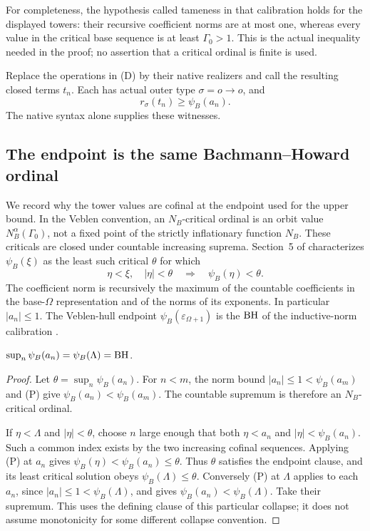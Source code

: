 For completeness, the hypothesis called tameness in that calibration
holds for the displayed towers: their recursive coefficient norms are
at most one, whereas every value in the critical base sequence is at
least $\Gamma_0>1$. This is the actual inequality needed in the proof;
no assertion that a critical ordinal is finite is used.

Replace the operations in (D) by their native realizers and call the
resulting closed terms $t_n$. Each has actual outer type $\sigma=o\to o$,
and
\[
 r_\sigma(t_n)\ge\psi_B(a_n).
 \tag{R}
\]
The native syntax alone supplies these witnesses.

\subsection{The endpoint is the same Bachmann--Howard ordinal}
We record why the tower values are cofinal at the endpoint used for the
upper bound. In the Veblen convention, an $N_B$-critical ordinal is an
orbit value $N_B^\alpha(\Gamma_0)$, not a fixed point of the strictly
inflationary function $N_B$. These criticals are closed under countable
increasing suprema. Section~5 of \cite{simmons2004} characterizes
$\psi_B(\xi)$ as the least such critical $\theta$ for which
\[
 \eta<\xi,\quad |\eta|<\theta
       \quad\Longrightarrow\quad \psi_B(\eta)<\theta .
 \tag{P}
\]
The coefficient norm is recursively the maximum of the countable
coefficients in the base-$\Omega$ representation and of the norms
of its exponents. In particular $|a_n|\le1$.
The Veblen-hull endpoint $\psi_B(\varepsilon_{\Omega+1})$ is the
$\mathrm{BH}$ of the inductive-norm calibration
\cite[Sections~9.4--9.5]{pohlers}.

\begin{lemma}\label{lem:tower-cofinality}
$\sup_n\psi_B(a_n)=\psi_B(\Lambda)=\mathrm{BH}$.
\end{lemma}
\begin{proof}
Let $\theta=\sup_n\psi_B(a_n)$. For $n<m$, the norm bound
$|a_n|\le1<\psi_B(a_m)$ and (P) give
$\psi_B(a_n)<\psi_B(a_m)$. The countable supremum is therefore
an $N_B$-critical ordinal.

If $\eta<\Lambda$ and $|\eta|<\theta$, choose $n$ large enough
that both $\eta<a_n$ and $|\eta|<\psi_B(a_n)$. Such a common
index exists by the two increasing cofinal sequences. Applying
(P) at $a_n$ gives $\psi_B(\eta)<\psi_B(a_n)\le\theta$.
Thus $\theta$ satisfies the endpoint clause, and its least
critical solution obeys $\psi_B(\Lambda)\le\theta$.
Conversely (P) at $\Lambda$ applies to each $a_n$, since
$|a_n|\le1<\psi_B(\Lambda)$, and gives
$\psi_B(a_n)<\psi_B(\Lambda)$. Take their supremum.
This uses the defining clause of this particular collapse; it
does not assume monotonicity for some different collapse convention.
\end{proof}

